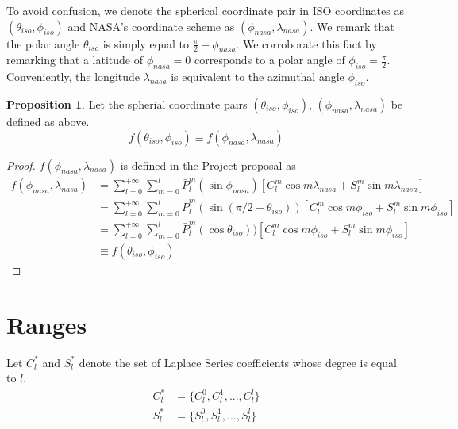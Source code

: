 \documentclass[a4paper]{article}
\theoremstyle{definition}
\newtheorem{proposition}{Proposition}
\begin{document}
To avoid confusion, we denote the spherical coordinate pair in ISO coordinates as $(\theta_{iso}, \phi_{iso})$ and NASA's coordinate scheme as $(\phi_{nasa}, \lambda_{nasa})$.
We remark that the polar angle $\theta_{iso}$ is simply equal to $\frac{\pi}{2} - \phi_{nasa}$. We corroborate this fact by remarking that a latitude of $\phi_{nasa} = 0$ corresponds to a polar
angle of $\phi_{iso} = \frac{\pi}{2}$. Conveniently, the longitude $\lambda_{nasa}$ is equivalent to the azimuthal angle $\phi_{iso}$.

\begin{proposition} Let the spherial coordinate pairs $(\theta_{iso}, \phi_{iso})$, $(\phi_{nasa}, \lambda_{nasa})$ be defined as above. 
    \begin{equation*}
        f(\theta_{iso}, \phi_{iso}) \equiv f(\phi_{nasa}, \lambda_{nasa})
    \end{equation*}

    
\end{proposition}



\begin{proof}
    $f(\phi_{nasa}, \lambda_{nasa})$ is defined in the Project proposal as 
    \begin{align} \label{eq:project_def} 
        f(\phi_{nasa}, \lambda_{nasa}) &= \sum_{l = 0}^{+\infty}\sum_{m = 0}^l \bar P_l^m(\sin\phi_{nasa})[C_l^m\cos m\lambda_{nasa} + S_l^m \sin m \lambda_{nasa}] \\ 
                                       &= \sum_{l = 0}^{+\infty}\sum_{m = 0}^l \bar P_l^m(\sin(\pi/2 - \theta_{iso}))[C_l^m\cos m\phi_{iso} + S_l^m \sin m \phi_{iso}] \\
                                       &= \sum_{l = 0}^{+\infty}\sum_{m = 0}^l \bar P_l^m(\cos\theta_{iso}))[C_l^m\cos m\phi_{iso} + S_l^m \sin m \phi_{iso}] \\
                                       &\equiv f(\theta_{iso}, \phi_{iso})
    \end{align}

\end{proof}

\section{Ranges}\label{ranges}

Let $C_l^*$ and $S_l^*$ denote the set of Laplace Series coefficients whose degree is equal to $l$.
\begin{align*}
   C_l^* &= \{C_l^0, C_l^1, ..., C_l^l\} \\
   S_l^* &= \{S_l^0, S_l^1, ..., S_l^l\} 
\end{align*}
\end{document}
